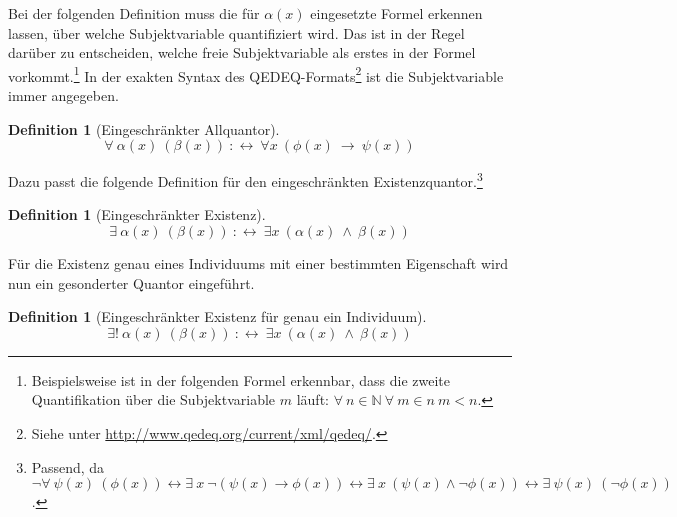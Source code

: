 \documentclass[a4paper,german,10pt,twoside]{book}
\theoremstyle{definition}
\newtheorem{defn}[thm]{Definition}
\theoremstyle{remark}
\begin{document}
\par
Bei der folgenden Definition muss die f{\"u}r $\alpha(x)$ eingesetzte Formel {\glqq erkennen lassen\grqq}, {\"u}ber welche Subjektvariable quantifiziert wird. Das ist in der Regel dar{\"u}ber zu entscheiden, welche freie Subjektvariable als erstes in der Formel vorkommt.\footnote{Beispielsweise ist in der folgenden Formel erkennbar, dass die zweite Quantifikation {\"u}ber die Subjektvariable $m$ l{\"a}uft: $\forall \ n \in \mathbb{N} \ \forall \ m \in n \ m < n $.} In der exakten Syntax des QEDEQ-Formats\footnote{Siehe unter \url{http://www.qedeq.org/current/xml/qedeq/}.} ist die Subjektvariable immer angegeben.

\begin{defn}[Eingeschr{\"a}nkter Allquantor]
\label{definition:restrictedUniversalQuantifier} \hypertarget{definition:restrictedUniversalQuantifier}{}
$$\forall \ \alpha(x) \ (\beta(x))\ :\leftrightarrow \ \forall x\ (\phi(x)\ \rightarrow \ \psi(x))$$

\end{defn}




\par
Dazu passt die folgende Definition f{\"u}r den eingeschr{\"a}nkten Existenzquantor.\footnote{Passend, da $\neg \forall \ \psi(x) \ (\phi(x)) \leftrightarrow \exists \ x \ \neg (\psi(x) \rightarrow \phi(x)) \leftrightarrow \exists \ x \ (\psi(x) \land \neg\phi(x)) \leftrightarrow \exists \ \psi(x) \ (\neg\phi(x))$.}

\begin{defn}[Eingeschr{\"a}nkter Existenz]
\label{definition:restrictedExistentialQuantifier} \hypertarget{definition:restrictedExistentialQuantifier}{}
$$\exists \ \alpha(x) \ (\beta(x))\ :\leftrightarrow \ \exists x\ (\alpha(x)\ \land \ \beta(x))$$

\end{defn}




\par
F{\"u}r die Existenz genau eines Individuums mit einer bestimmten Eigenschaft wird nun ein gesonderter Quantor eingef{\"u}hrt.

\begin{defn}[Eingeschr{\"a}nkter Existenz f{\"u}r genau ein Individuum]
\label{definition:restrictedUniquenessQuantifier} \hypertarget{definition:restrictedUniquenessQuantifier}{}
$$\exists! \ \alpha(x) \ (\beta(x))\ :\leftrightarrow \ \exists x\ (\alpha(x)\ \land \ \beta(x))$$

\end{defn}
\end{document}
